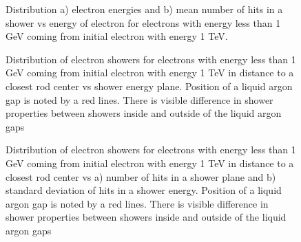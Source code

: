 \begin{figure}[!tbp]
\begin{minipage}[h]{0.49\linewidth}
\end{minipage}
\hfill
\begin{minipage}[h]{0.49\linewidth}
\end{minipage}
\caption{Distribution a) electron energies and b) mean number of hits in a shower vs energy of electron for electrons with energy less than 1 GeV coming from initial electron with energy 1 TeV. }
\label{fig:TrackEnergy}
\end{figure}



\begin{figure}[!tbp]
\caption{Distribution of electron showers for electrons with energy less than 1 GeV coming from initial electron with energy 1 TeV in distance to a closest rod center vs shower energy plane. Position of a liquid argon gap is noted by a red lines. There is visible difference in shower properties between showers inside and outside of the liquid argon gaps}
\label{fig:FSProduction}
\end{figure}

\begin{figure}[!tbp]
\begin{minipage}[h]{0.49\linewidth}
\end{minipage}
\hfill
\begin{minipage}[h]{0.49\linewidth}
\end{minipage}
\caption{Distribution of electron showers for electrons with energy less than 1 GeV coming from initial electron with energy 1 TeV in distance to a closest rod center vs a) number of hits in a shower plane and b) standard deviation of hits in a shower energy. Position of a liquid argon gap is noted by a red lines. There is visible difference in shower properties between showers inside and outside of the liquid argon gaps}
\label{fig:ShowerProp}
\end{figure}

